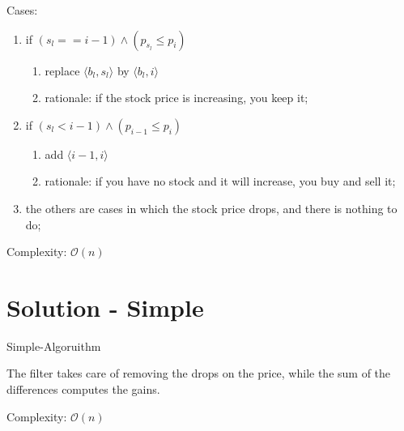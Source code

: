 \documentclass{article}
\theoremstyle{definition}
\theoremstyle{plain}
\begin{document}
Cases:

\begin{enumerate}
    \item if $(s_l == i-1) \land (p_{s_l} \leqslant p_i)$
    \begin{enumerate}
        \item replace $\langle b_l, s_l \rangle$ by $\langle b_l, i \rangle$
        \item rationale: if the stock price is increasing, you keep it;
    \end{enumerate}
    \item if $(s_l < i-1) \land (p_{i-1} \leqslant p_i)$
    \begin{enumerate}
        \item add $\langle i-1, i \rangle$
        \item rationale: if you have no stock and it will increase, you buy and sell it;
    \end{enumerate}
    \item the others are cases in which the stock price drops, and there is nothing to do;
\end{enumerate}

Complexity: $\mathcal{O}(n)$

\section{Solution - Simple}

\begin{algorithm}[H]
    \caption{Simple-Algoruithm}
    \label{algo:ga}
    \begin{algorithmic}[1]
    \end{algorithmic}
\end{algorithm}

The filter takes care of removing the drops on the price, while the sum of the differences computes the gains.

Complexity: $\mathcal{O}(n)$
\end{document}
